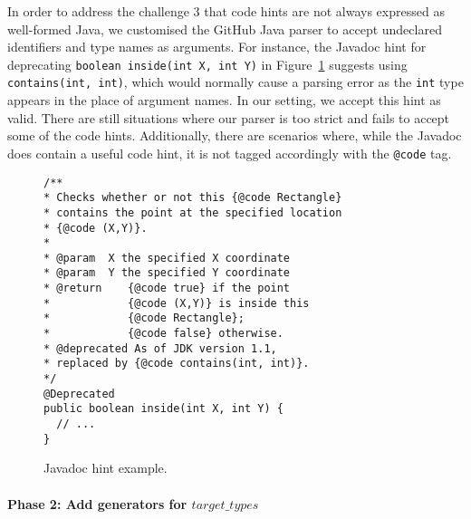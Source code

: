 \documentclass[sigconf,review,anonymous]{acmart}
\begin{document}
%
In order to address the challenge 3 that code hints are not always expressed as well-formed Java,
we customised the
GitHub Java parser
to accept undeclared identifiers and type names
as arguments. For instance, the Javadoc hint for deprecating \texttt{boolean inside(int X, int Y)}
in Figure~\ref{ex:javadoc-hint} suggests using
\texttt{contains(int, int)}, which would normally cause a parsing error as the \texttt{int} type
appears in the place of argument names. In our setting, we accept this hint as valid.
There are still situations where our parser is too strict and fails to accept
some of the code hints. Additionally, there are scenarios where, while the Javadoc
does contain a useful code hint, it is not tagged accordingly with
the \texttt{@code} tag. %

 
\begin{figure}
\begin{lstlisting}[mathescape=true,showstringspaces=false]
/**
* Checks whether or not this {@code Rectangle}
* contains the point at the specified location
* {@code (X,Y)}.
*
* @param  X the specified X coordinate
* @param  Y the specified Y coordinate
* @return    {@code true} if the point
*            {@code (X,Y)} is inside this
*            {@code Rectangle};
*            {@code false} otherwise.
* @deprecated As of JDK version 1.1,
* replaced by {@code contains(int, int)}.
*/
@Deprecated
public boolean inside(int X, int Y) {
  // ...
}
\end{lstlisting}
\caption{Javadoc hint example.}
\label{ex:javadoc-hint}
\end{figure}




\paragraph{{\bf Phase 2: Add generators for $target\_types$}}
\end{document}
